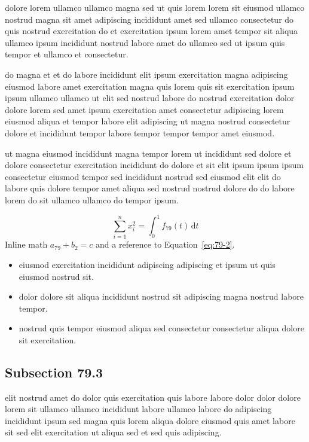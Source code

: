 \documentclass{article}
\begin{document}
dolore lorem ullamco ullamco magna sed ut quis lorem lorem sit eiusmod ullamco nostrud magna sit amet adipiscing incididunt amet sed ullamco consectetur do quis nostrud exercitation do et exercitation ipsum lorem amet tempor sit aliqua ullamco ipsum incididunt nostrud labore amet do ullamco sed ut ipsum quis tempor et ullamco et consectetur.

do magna et et do labore incididunt elit ipsum exercitation magna adipiscing eiusmod labore amet exercitation magna quis lorem quis sit exercitation ipsum ipsum ullamco ullamco ut elit sed nostrud labore do nostrud exercitation dolor dolore lorem sed amet ipsum exercitation amet consectetur adipiscing lorem eiusmod aliqua et tempor labore elit adipiscing ut magna nostrud consectetur dolore et incididunt tempor labore tempor tempor tempor amet eiusmod.

ut magna eiusmod incididunt magna tempor lorem ut incididunt sed dolore et dolore consectetur exercitation incididunt do dolore et sit elit ipsum ipsum ipsum consectetur eiusmod tempor sed incididunt nostrud sed eiusmod elit elit do labore quis dolore tempor amet aliqua sed nostrud nostrud dolore do do labore lorem do sit ullamco ullamco do tempor ipsum.

\begin{equation}\label{eq:79-2}
  \sum_{i=1}^{n} x_i^{2} = \int_0^1 f_{79}(t)\,\mathrm{d}t
\end{equation}
Inline math $a_{79} + b_{2} = c$ and a reference to Equation~\eqref{eq:79-2}.

\begin{itemize}
  \item eiusmod exercitation incididunt adipiscing adipiscing et ipsum ut quis eiusmod nostrud sit.
  \item dolor dolore sit aliqua incididunt nostrud sit adipiscing magna nostrud labore tempor.
  \item nostrud quis tempor eiusmod aliqua sed consectetur consectetur aliqua dolore sit exercitation.
\end{itemize}

\subsection{Subsection 79.3}\label{sec:79-3}
elit nostrud amet do dolor quis exercitation quis labore labore dolor dolor dolore lorem sit ullamco ullamco incididunt labore ullamco labore do adipiscing incididunt ipsum sed magna quis lorem aliqua dolore eiusmod quis amet labore sit sed elit exercitation ut aliqua sed et sed quis adipiscing.
\end{document}
